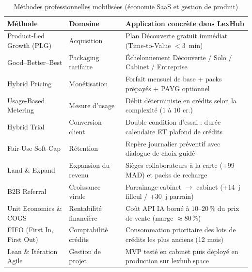 \begin{table}[H]
\centering
\caption{Méthodes professionnelles mobilisées (économie SaaS et gestion de produit)}
\label{tab:methodes-eco}
\small
\renewcommand{\arraystretch}{1.12}
\begin{tabular}{@{}p{3.8cm}p{3.8cm}p{5.0cm}@{}}
\toprule
\textbf{Méthode} & \textbf{Domaine} & \textbf{Application concrète dans LexHub} \\
\midrule
Product-Led Growth (PLG) & Acquisition & Plan Découverte gratuit immédiat (Time-to-Value $< 3$~min) \\
Good--Better--Best & Packaging tarifaire & Échelonnement Découverte / Solo / Cabinet / Entreprise \\
Hybrid Pricing & Monétisation & Forfait mensuel de base + packs prépayés + PAYG optionnel \\
Usage-Based Metering & Mesure d'usage & Débit déterministe en crédits selon la complexité ($1$ à $10$ cr.) \\
Hybrid Trial & Conversion client & Double condition d'essai : durée calendaire ET plafond de crédits \\
Fair-Use Soft-Cap & Rétention & Repère journalier préventif avec dialogue de choix guidé \\
Land \& Expand & Expansion du revenu & Sièges collaborateurs à la carte (+99 MAD) et packs de recharge \\
B2B Referral & Croissance virale & Parrainage cabinet $\rightarrow$ cabinet (+14~j filleul / +30~j parrain) \\
Unit Economics \& COGS & Rentabilité financière & Coût API IA borné à $10$--$20\,\%$ du prix de vente (marge $\approx 80\,\%$) \\
FIFO (First In, First Out) & Comptabilité crédits & Consommation prioritaire des lots de crédits les plus anciens (12 mois) \\
Lean \& Itération Agile & Gestion de projet & MVP testé en cabinet puis déployé en production sur lexhub.space \\
\bottomrule
\end{tabular}
\end{table}

